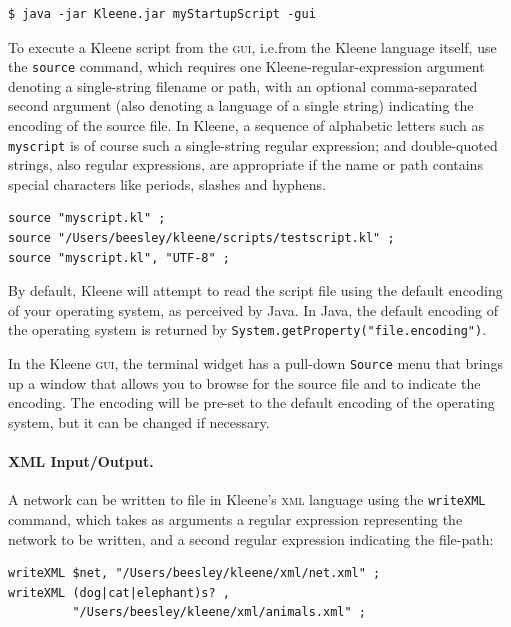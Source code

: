 \documentclass[letterpaper,12pt]{article}
\newcommand{\acro}{\textsc}
\begin{document}
\begin{Verbatim}[fontsize=\small]
$ java -jar Kleene.jar myStartupScript -gui
\end{Verbatim}

To execute a Kleene script from the \acro{gui}, i.e.\@ from the Kleene
language itself, use the \texttt{source} command, which requires one
Kleene-regular-expression argument denoting a single-string filename or path,
with an optional comma-separated second argument (also denoting a language of
a single string) indicating the encoding of the source file.  In Kleene, a
sequence of alphabetic letters such as \texttt{myscript} is of course such a
single-string regular expression; and double-quoted strings, also regular
expressions, are appropriate if the name or path contains special characters
like periods, slashes and hyphens.

\begin{Verbatim}[fontsize=\small]
source "myscript.kl" ;
source "/Users/beesley/kleene/scripts/testscript.kl" ;
source "myscript.kl", "UTF-8" ;
\end{Verbatim}

By default, Kleene will attempt to read the script file using the default
encoding of your operating system, as perceived by Java. In Java,
the default encoding of the operating system is returned by
\texttt{System.getProperty("file.encoding")}. 

In the Kleene \acro{gui}, the terminal widget has a pull-down \verb!Source!
menu that brings up a window that allows you to browse for the source file and
to indicate the encoding.  The encoding will be pre-set to the default encoding
of the operating system, but it can be changed if necessary.

\paragraph{XML Input/Output.}

A network can be written to file in Kleene's 
\acro{xml} language using the \texttt{writeXML} command,
which takes as arguments a regular expression representing the network to be
written, and a second regular expression indicating the file-path:

\begin{Verbatim}[fontsize=\small]
writeXML $net, "/Users/beesley/kleene/xml/net.xml" ;
writeXML (dog|cat|elephant)s? , 
         "/Users/beesley/kleene/xml/animals.xml" ;
\end{Verbatim}
\end{document}
